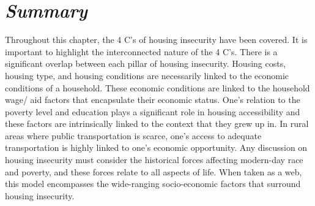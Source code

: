\section{\textit{Summary}}
Throughout this chapter, the 4 C's of housing insecurity have been covered. It is important to highlight the interconnected nature of the 4 C's. There is a significant overlap between each pillar of housing insecurity. Housing costs, housing type, and housing conditions are necessarily linked to the economic conditions of a household. These economic conditions are linked to the household wage/ aid factors that encapsulate their economic status. One's relation to the poverty level and education plays a significant role in housing accessibility and these factors are intrinsically linked to the context that they grew up in. In rural areas where public transportation is scarce, one's access to adequate transportation is highly linked to one's economic opportunity. Any discussion on housing insecurity must consider the historical forces affecting modern-day race and poverty, and these forces relate to all aspects of life. When taken as a web, this model encompasses the wide-ranging socio-economic factors that surround housing insecurity. 
\endinput